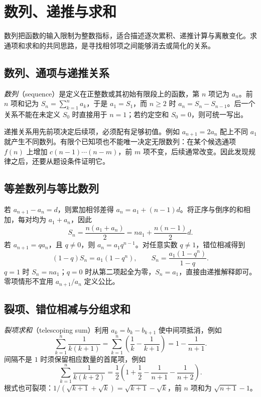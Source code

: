 \setcounter{chapter}{8} %
\chapter{数列、递推与求和}
\label{chap:em-sequences}
数列把函数的输入限制为整数指标，适合描述逐次累积、递推计算与离散变化。求通项和求和的共同思路，是寻找相邻项之间能够消去或简化的关系。

\section{数列、通项与递推关系}
\emph{数列}（sequence）是定义在正整数或其初始有限段上的函数，第 $n$ 项记为 $a_n$。前 $n$ 项和记为 $S_n=\sum_{k=1}^n a_k$，于是 $a_1=S_1$，而 $n\ge2$ 时 $a_n=S_n-S_{n-1}$。后一个关系不能在未定义 $S_0$ 时直接用于 $n=1$；若约定空和 $S_0=0$，则可统一写出。

递推关系用先前项决定后续项，必须配有足够初值。例如 $a_{n+1}=2a_n$ 配上不同 $a_1$ 就产生不同数列。有限个已知项也不能唯一决定无限数列：在某个候选通项 $f(n)$ 上增加 $c(n-1)\cdots(n-m)$，前 $m$ 项不变，后续通常改变。因此发现规律之后，还要从题设条件证明它。

\section{等差数列与等比数列}
若 $a_{n+1}-a_n=d$，则累加相邻差得 $a_n=a_1+(n-1)d$。将正序与倒序的和相加，每对均为 $a_1+a_n$，因此
\[
 S_n=\frac{n(a_1+a_n)}2=na_1+\frac{n(n-1)}2d.
\]
若 $a_{n+1}=qa_n$，且 $q\ne0$，则 $a_n=a_1q^{n-1}$。对任意实数 $q\ne1$，错位相减得到
\begin{equation}\label{eq:em-geometric-sum}
 (1-q)S_n=a_1(1-q^n),\qquad
 S_n=\frac{a_1(1-q^n)}{1-q}.
\end{equation}
$q=1$ 时 $S_n=na_1$；$q=0$ 时从第二项起全为零，$S_n=a_1$，直接由递推解释即可。零项情形不宜用 $a_{n+1}/a_n$ 定义公比。

\section{裂项、错位相减与分组求和}
\emph{裂项求和}（telescoping sum）利用 $a_k=b_k-b_{k+1}$ 使中间项抵消，例如
\[
 \sum_{k=1}^n\frac1{k(k+1)}
 =\sum_{k=1}^n\left(\frac1k-\frac1{k+1}\right)
 =1-\frac1{n+1}.
\]
间隔不是 $1$ 时须保留相应数量的首尾项，例如
\[
 \sum_{k=1}^n\frac1{k(k+2)}
 =\frac12\left(1+\frac12-\frac1{n+1}-\frac1{n+2}\right).
\]
根式也可裂项：$1/(\sqrt{k+1}+\sqrt k)=\sqrt{k+1}-\sqrt k$，前 $n$ 项和为 $\sqrt{n+1}-1$。

